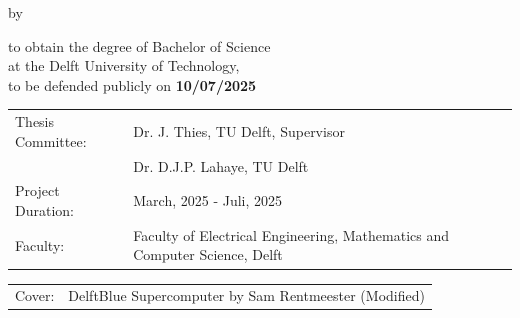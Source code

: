 \begin{titlepage}

\begin{center}

{\makeatletter
\largetitlestyle\fontsize{45}{45}\selectfont\@title
\makeatother}

{\makeatletter
\ifdefvoid{\@subtitle}{}{\bigskip\titlestyle\fontsize{20}{20}\selectfont\@subtitle}
\makeatother}

\bigskip
\bigskip

by

\bigskip
\bigskip

{\makeatletter
\largetitlestyle\fontsize{25}{25}\selectfont\@author
\makeatother}

\bigskip
\bigskip

to obtain the degree of Bachelor of Science \\
at the Delft University of Technology, \\
to be defended publicly on \textbf{10/07/2025}
\vfill

\begin{tabular}{ll}
    Thesis Committee: & Dr. J. Thies,      TU Delft, Supervisor\\
                      & Dr. D.J.P. Lahaye, TU Delft \\
    Project Duration: & March, 2025 - Juli, 2025 \\
    Faculty: & Faculty of Electrical Engineering, Mathematics and Computer Science, Delft
\end{tabular}

\bigskip
\bigskip

\begin{tabular}{p{15mm}p{10cm}}
    Cover: & DelftBlue Supercomputer by Sam Rentmeester (Modified) \\
\end{tabular}

\end{center}


\end{titlepage}
